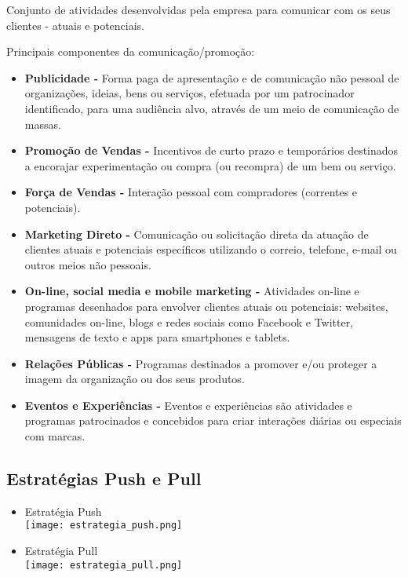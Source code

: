 \documentclass[11pt]{article}
\begin{document}
Conjunto de atividades desenvolvidas pela empresa para comunicar com os seus clientes - atuais e potenciais.

Principais componentes da comunicação/promoção:
\begin{itemize}[topsep=0pt]
    \item \textbf{Publicidade -} Forma paga de apresentação e de comunicação não pessoal de organizações, ideias, bens ou serviços, efetuada por um patrocinador identificado, para uma audiência alvo, através de um meio de comunicação de massas.
    \item \textbf{Promoção de Vendas -} Incentivos de curto prazo e temporários destinados a encorajar experimentação ou compra (ou recompra) de um bem ou serviço.
    \item \textbf{Força de Vendas -} Interação pessoal com compradores (correntes e potenciais).
    \item \textbf{Marketing Direto -} Comunicação ou solicitação direta da atuação de clientes atuais e potenciais específicos utilizando o correio, telefone, e-mail ou outros meios não pessoais.
    \item \textbf{On-line, social media e mobile marketing -} Atividades on-line e programas desenhados para envolver clientes atuais ou potenciais: websites, comunidades on-line, blogs e redes sociais como Facebook e Twitter, mensagens de texto e apps para smartphones e tablets.
    \item \textbf{Relações Públicas -} Programas destinados a promover e/ou proteger a imagem da organização ou dos seus produtos.
    \item \textbf{Eventos e Experiências -} Eventos e experiências são atividades e programas patrocinados e concebidos para criar interações diárias ou especiais com marcas.
\end{itemize}

\subsection*{Estratégias Push e Pull}

\begin{itemize}[topsep=0pt,itemsep=0pt]
    \item Estratégia Push \\
          \texttt{[image: estrategia\_push.png]}
    \item Estratégia Pull \\[5pt]
          \texttt{[image: estrategia\_pull.png]}
\end{itemize}
\end{document}
